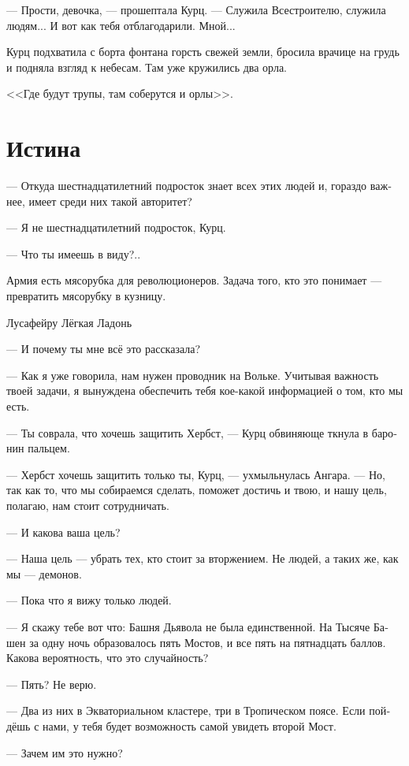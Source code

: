 \documentclass[a4paper,12pt,fleqn]{book}\usepackage{cooltooltips}\usepackage{polyglossia}\setdefaultlanguage[babelshorthands=true]{russian}\setotherlanguage{english}\defaultfontfeatures{Ligatures=TeX,Mapping=tex-text} \usepackage{xcolor}\definecolor{lightgray}{HTML}{bbbbbb}\color{lightgray}\newcommand{\ml}[3]{\textenglish{\textcolor{black}{#3}}}
\newcommand{\asterism}{\vspace{1em}{\centering\Large\bfseries$\ast~\ast~\ast$\par}\vspace{1em}}
\begin{document}
--- Прости, девочка, --- прошептала Курц.
--- Служила Всестроителю, служила людям...
И вот как тебя отблагодарили.
Мной...

Курц подхватила с борта фонтана горсть свежей земли, бросила врачице на грудь и подняла взгляд к небесам.
Там уже кружились два орла.

<<Где будут трупы, там соберутся и орлы>>.

\section{Истина}

--- Откуда шестнадцатилетний подросток знает всех этих людей и, гораздо важнее, имеет среди них такой авторитет?

--- Я не шестнадцатилетний подросток, Курц.

--- Что ты имеешь в виду?..

\asterism

\epigraph{
Армия есть мясорубка для революционеров.
Задача того, кто это понимает --- превратить мясорубку в кузницу.}
{Лусафейру Лёгкая Ладонь}

--- И почему ты мне всё это рассказала?

--- Как я уже говорила, нам нужен проводник на Вольке.
Учитывая важность твоей задачи, я вынуждена обеспечить тебя кое-какой информацией о том, кто мы есть.

--- Ты соврала, что хочешь защитить Хербст, --- Курц обвиняюще ткнула в баронин пальцем.

--- Хербст хочешь защитить только ты, Курц, --- ухмыльнулась Ангара.
--- Но, так как то, что мы собираемся сделать, поможет достичь и твою, и нашу цель, полагаю, нам стоит сотрудничать.

--- И какова ваша цель?

--- Наша цель --- убрать тех, кто стоит за вторжением.
Не людей, а таких же, как мы --- демонов.

--- Пока что я вижу только людей.

--- Я скажу тебе вот что: Башня Дьявола не была единственной.
На Тысяче Башен за одну ночь образовалось пять Мостов, и все пять на пятнадцать баллов.
Какова вероятность, что это случайность?

--- Пять?
Не верю.

--- Два из них в Экваториальном кластере, три в Тропическом поясе.
Если пойдёшь с нами, у тебя будет возможность самой увидеть второй Мост.

--- Зачем им это нужно?
\end{document}
